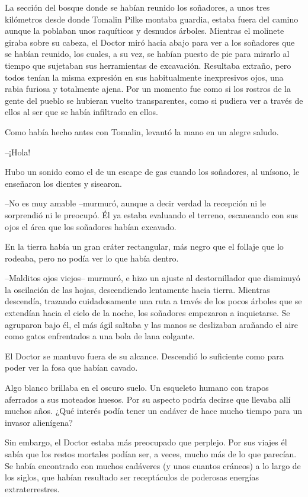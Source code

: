 La sección del bosque donde se habían reunido los soñadores, a unos tres kilómetros desde donde Tomalin Pilke montaba guardia, estaba fuera del camino aunque la poblaban unos raquíticos y desnudos árboles. Mientras el molinete giraba sobre su cabeza, el Doctor miró hacia abajo para ver a los soñadores que se habían reunido, los cuales, a su vez, se habían puesto de pie para mirarlo al tiempo que sujetaban sus herramientas de excavación. Resultaba extraño, pero todos tenían la misma expresión en sus habitualmente inexpresivos ojos, una rabia furiosa y totalmente ajena. Por un momento fue como si los rostros de la gente del pueblo se hubieran vuelto transparentes, como si pudiera ver a través de ellos al ser que se había infiltrado en ellos.

Como había hecho antes con Tomalin, levantó la mano en un alegre saludo.

--¡Hola!

Hubo un sonido como el de un escape de gas cuando los soñadores, al unísono, le enseñaron los dientes y sisearon.

--No es muy amable --murmuró, aunque a decir verdad la recepción ni le sorprendió ni le preocupó. Él ya estaba evaluando el terreno, escaneando con sus ojos el área que los soñadores habían excavado.

En la tierra había un gran cráter rectangular, más negro que el follaje que lo rodeaba, pero no podía ver lo que había dentro. 

--Malditos ojos viejos-- murmuró, e hizo un ajuste al destornillador que disminuyó la oscilación de las hojas, descendiendo lentamente hacia tierra. Mientras descendía, trazando cuidadosamente una ruta a través de los pocos árboles que se extendían hacia el cielo de la noche, los soñadores empezaron a inquietarse. Se agruparon bajo él, el más ágil saltaba y las manos se deslizaban arañando el aire como gatos enfrentados a una bola de lana colgante.

El Doctor se mantuvo fuera de su alcance. Descendió lo suficiente como para poder ver la fosa que habían cavado.

Algo blanco brillaba en el oscuro suelo. Un esqueleto humano con trapos aferrados a sus moteados huesos. Por su aspecto podría decirse que llevaba allí muchos años. ¿Qué interés podía tener un cadáver de hace mucho tiempo para un invasor alienígena?

Sin embargo, el Doctor estaba más preocupado que perplejo. Por sus viajes él sabía que los restos mortales podían ser, a veces, mucho más de lo que parecían. Se había encontrado con muchos cadáveres (y unos cuantos cráneos) a lo largo de los siglos, que habían resultado ser receptáculos de poderosas energías extraterrestres.

